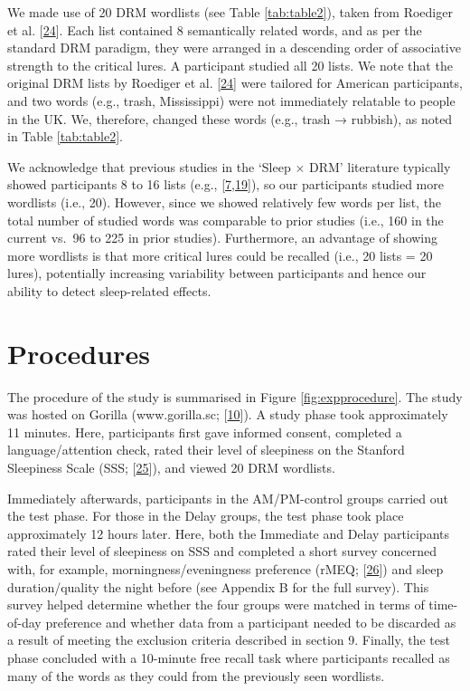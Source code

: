 \documentclass[
]{article}
\begin{document}
We made use of 20 DRM wordlists (see Table \ref{tab:table2}), taken from Roediger et al. {[}\protect\hyperlink{ref-roediger2001a}{24}{]}. Each list contained 8 semantically related words, and as per the standard DRM paradigm, they were arranged in a descending order of associative strength to the critical lures. A participant studied all 20 lists. We note that the original DRM lists by Roediger et al. {[}\protect\hyperlink{ref-roediger2001a}{24}{]} were tailored for American participants, and two words (e.g., trash, Mississippi) were not immediately relatable to people in the UK. We, therefore, changed these words (e.g., trash → rubbish), as noted in Table \ref{tab:table2}.

We acknowledge that previous studies in the `Sleep \(\times\) DRM' literature typically showed participants 8 to 16 lists (e.g., {[}\protect\hyperlink{ref-payne2009a}{7},\protect\hyperlink{ref-mckeon2012a}{19}{]}), so our participants studied more wordlists (i.e., 20). However, since we showed relatively few words per list, the total number of studied words was comparable to prior studies (i.e., 160 in the current vs.~96 to 225 in prior studies). Furthermore, an advantage of showing more wordlists is that more critical lures could be recalled (i.e., 20 lists = 20 lures), potentially increasing variability between participants and hence our ability to detect sleep-related effects.

\hypertarget{procedures}{%
\section{Procedures}\label{procedures}}

The procedure of the study is summarised in Figure \ref{fig:expprocedure}. The study was hosted on Gorilla (www.gorilla.sc; {[}\protect\hyperlink{ref-anwyl-irvine2020a}{10}{]}). A study phase took approximately 11 minutes. Here, participants first gave informed consent, completed a language/attention check, rated their level of sleepiness on the Stanford Sleepiness Scale (SSS; {[}\protect\hyperlink{ref-hoddes1973a}{25}{]}), and viewed 20 DRM wordlists.

Immediately afterwards, participants in the AM/PM-control groups carried out the test phase. For those in the Delay groups, the test phase took place approximately 12 hours later. Here, both the Immediate and Delay participants rated their level of sleepiness on SSS and completed a short survey concerned with, for example, morningness/eveningness preference (rMEQ; {[}\protect\hyperlink{ref-adan1991a}{26}{]}) and sleep duration/quality the night before (see Appendix B for the full survey). This survey helped determine whether the four groups were matched in terms of time-of-day preference and whether data from a participant needed to be discarded as a result of meeting the exclusion criteria described in section 9. Finally, the test phase concluded with a 10-minute free recall task where participants recalled as many of the words as they could from the previously seen wordlists.
\end{document}
